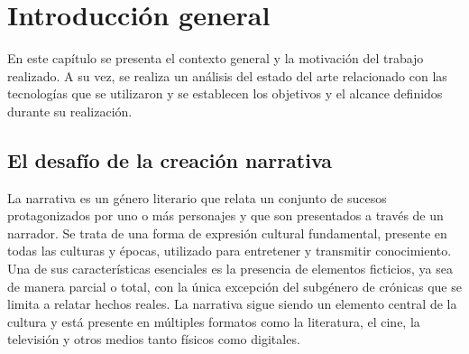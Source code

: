 
\chapter{Introducción general} %

\label{Chapter1} %
\label{IntroGeneral}

En este capítulo se presenta el contexto general y la motivación del trabajo realizado.
A su vez, se realiza un análisis del estado del arte relacionado con las tecnologías que se utilizaron
y se establecen los objetivos y el alcance definidos durante su realización.

\newcommand{\keyword}[1]{\textbf{#1}}
\newcommand{\tabhead}[1]{\textbf{#1}}
\newcommand{\code}[1]{\texttt{#1}}
\newcommand{\file}[1]{\texttt{\bfseries#1}}
\newcommand{\option}[1]{\texttt{\itshape#1}}
\newcommand{\grados}{$^{\circ}$}



\section{El desafío de la creación narrativa}

La narrativa\cite{narrative_def} es un género literario que relata un conjunto de sucesos
protagonizados por uno o más personajes y que son presentados a través de un narrador.
Se trata de una forma de expresión cultural fundamental, presente en todas las culturas y épocas,
utilizado para entretener y transmitir conocimiento.
Una de sus características esenciales es la presencia de elementos ficticios, ya sea de manera parcial o total,
con la única excepción del subgénero de crónicas que se limita a relatar hechos reales.
La narrativa sigue siendo un elemento central de la cultura y está
presente en múltiples formatos como la literatura, el cine, la televisión y otros medios tanto físicos como digitales.

